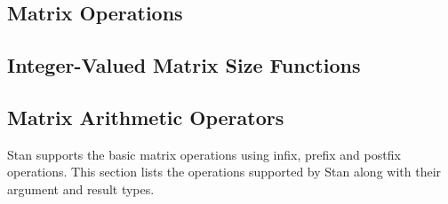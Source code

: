 \begin{description}
\begin{description}
\begin{description}
\begin{description}
\begin{description}
\begin{description}
\begin{description}
\begin{description}
\begin{description}
\begin{description}
\begin{description}
\begin{description}
\begin{description}
\begin{description}
\begin{description}
\begin{description}
\begin{description}
\begin{description}
\begin{description}
\begin{description}
\begin{description}
\begin{description}
\begin{description}
\begin{description}
\begin{description}
\begin{description}
\begin{description}
\begin{description}
\begin{description}
\begin{description}
\begin{description}
\begin{description}
\chapter{Matrix Operations}

\section{Integer-Valued Matrix Size Functions}

\begin{description} %



\section{Matrix Arithmetic Operators}

Stan supports the basic matrix operations using infix, prefix and postfix operations.  This section lists the operations supported by Stan along with their argument and result types.


\end{description}
\end{description}
\end{description}
\end{description}
\end{description}
\end{description}
\end{description}
\end{description}
\end{description}
\end{description}
\end{description}
\end{description}
\end{description}
\end{description}
\end{description}
\end{description}
\end{description}
\end{description}
\end{description}
\end{description}
\end{description}
\end{description}
\end{description}
\end{description}
\end{description}
\end{description}
\end{description}
\end{description}
\end{description}
\end{description}
\end{description}
\end{description}
\end{description}
